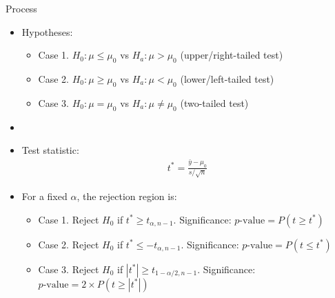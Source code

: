 \documentclass[xcolor=dvipsnames]{beamer}
\begin{document}
\begin{frame}{Process}
\begin{itemize}
	\item Hypotheses:  \pause
	\begin{itemize}
		\item Case 1. $H_0: \mu \leq \mu_0$ vs $H_a: \mu > \mu_0$ (upper/right-tailed test)  \pause
		\item Case 2. $H_0: \mu \geq \mu_0$ vs $H_a: \mu < \mu_0$ (lower/left-tailed test)  \pause
		\item Case 3. $H_0: \mu = \mu_0$ vs $H_a: \mu \neq \mu_0$ (two-tailed test)  \pause
	\end{itemize}
	\item[]
	\item Test statistic:  \pause
	\begin{gather*}
	t^* = \frac{\bar{y} - \mu_0}{s / \sqrt{n}}
	\end{gather*}  \pause
	
	\item For a fixed $\alpha$, the rejection region is:
	\begin{itemize}
		\item Case 1. Reject $H_0$ if $t^* \geq t_{\alpha, n-1}$. Significance: $p\text{-value}=P(t \geq t^*)$  \pause
		\item Case 2. Reject $H_0$ if $t^* \leq -t_{\alpha, n-1}$. Significance: $p\text{-value}=P(t \leq t^*)$  \pause
		\item Case 3. Reject $H_0$ if $|t^*| \geq t_{1-\alpha / 2, n-1}$. Significance: $p\text{-value}=2 \times P(t \geq |t^*|)$
	\end{itemize}
\end{itemize}
\end{frame}
\end{document}
